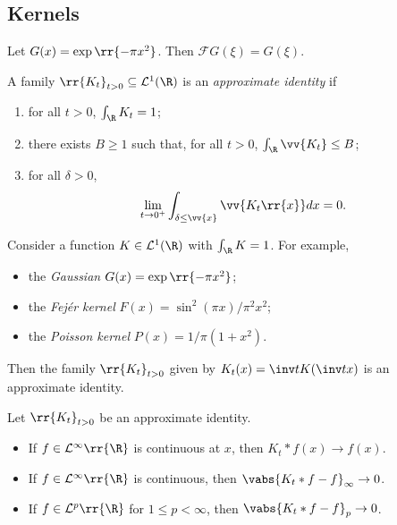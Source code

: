 \documentclass{article}
\begin{document}
\subsection{Kernels}

\begin{proposition}
  Let $G(x)=\exp\rr{-\pi x^2}$. Then $\mathcal FG(\xi)=G(\xi)$.
\end{proposition}

\begin{definition}
  A family $\rr{K_t}_{t>0}\subseteq\mathcal L^1(\R)$
  is an \emph{approximate identity} if
  \begin{enumerate}
    \item for all $t>0$, $\int_{\R} K_t = 1$;
    \item there exists $B\geq 1$ such that, for all $t>0$, $\int_{\R}\vv{K_t}\leq B$;
    \item for all $\delta>0$,
      \begin{align*}
        \lim_{t\to 0^+}\int_{\delta\leq\vv{x}}\vv{K_t\rr{x}} dx = 0.
      \end{align*}
  \end{enumerate}
\end{definition}

\begin{example}
  Consider a function $K\in\mathcal L^1(\R)$ with $\int_\R K = 1$.
  For example,
  \begin{itemize}
    \item the \emph{Gaussian} $G(x)=\exp\rr{-\pi x^2}$;
    \item the \emph{Fej\'er kernel} $F(x)=\sin^2(\pi x)/\pi^2x^2$;
    \item the \emph{Poisson kernel} $P(x)=1/\pi(1+x^2)$.
  \end{itemize}
  Then the family $\rr{K_t}_{t>0}$ given by
  $K_t(x) = \inv t K(\inv t x)$ is an approximate identity.
\end{example}

\begin{theorem}
  Let $\rr{K_t}_{t>0}$ be an approximate identity.  \begin{itemize}
    \item  If $f\in\mathcal L^{\infty}\rr{\R}$ is continuous at $x$,
      then $K_t * f(x) \to f(x)$.
    \item  If $f\in\mathcal L^{\infty}\rr{\R}$ is continuous,
      then $\vabs{K_t * f - f}_\infty \to 0$.
    \item  If $f\in\mathcal L^p\rr{\R}$ for $1\leq p<\infty$,
      then $\vabs{K_t * f - f}_p \to 0$.
  \end{itemize}
\end{theorem}
\end{document}
